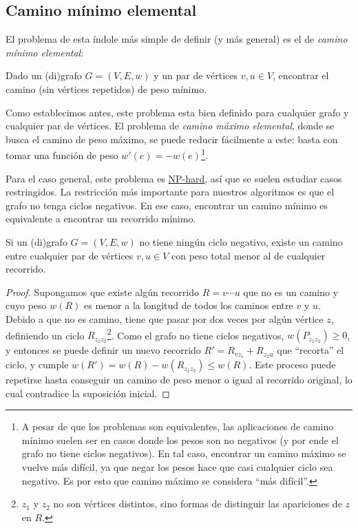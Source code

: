 \subsection{Camino mínimo elemental}

El problema de esta índole más simple de definir (y más general) es el de \textit{camino mínimo elemental}:

\begin{problema}
    Dado un (di)grafo $G = (V, E, w)$ y un par de vértices $v, u \in V$, encontrar el camino (sin vértices repetidos) de peso mínimo.
\end{problema}

Como establecimos antes, este problema esta bien definido para cualquier grafo y cualquier par de vértices. El problema de \textit{camino máximo elemental}, donde se busca el camino de peso máximo, se puede reducir fácilmente a este: basta con tomar una función de peso $w'(e) = -w(e)$\footnote{A pesar de que los problemas son equivalentes, las aplicaciones de camino mínimo suelen ser en casos donde los pesos son no negativos (y por ende el grafo no tiene ciclos negativos). En tal caso, encontrar un camino máximo se vuelve más difícil, ya que negar los pesos hace que casi cualquier ciclo sea negativo. Es por esto que camino máximo se considera ``más difícil''.}.

Para el caso general, este problema es \hyperref[np-hard]{NP-hard}, así que se suelen estudiar casos restringidos. La restricción más importante para nuestros algoritmos es que el grafo no tenga ciclos negativos. En ese caso, encontrar un camino mínimo es equivalente a encontrar un recorrido mínimo.

\label{teorema-ciclos-negativos}
\begin{theorem*}
    Si un (di)grafo $G = (V, E, w)$ no tiene ningún ciclo negativo, existe un camino entre cualquier par de vértices $v, u \in V$ con peso total menor al de cualquier recorrido.
\end{theorem*}
\begin{proof}
    Supongamos que existe algún recorrido $R = v \cdots u$ que no es un camino y cuyo peso $w(R)$ es menor a la longitud de todos los caminos entre $v$ y $u$. Debido a que no es camino, tiene que pasar por dos veces por algún vértice $z$, definiendo un ciclo $R_{z_1 z_2}$\footnote{$z_1$ y $z_2$ no son vértices distintos, sino formas de distinguir las apariciones de $z$ en $R$.}. Como el grafo no tiene ciclos negativos, $w(P_{z_1 z_2}) \geq 0$, y entonces se puede definir un nuevo recorrido $R' = R_{v z_1} + R_{z_2 u}$ que ``recorta'' el ciclo, y cumple $w(R') = w(R) - w(R_{z_1 z_2}) \leq w(R)$. Este proceso puede repetirse hasta conseguir un camino de peso menor o igual al recorrido original, lo cual contradice la suposición inicial.
\end{proof}

